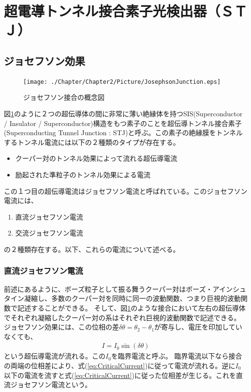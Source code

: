 	
\section{超電導トンネル接合素子光検出器（ＳＴＪ）}

	\subsection{ジョセフソン効果}
	\begin{figure}[htbp]
  		\begin{center}
    			\texttt{[image: ./Chapter/Chapter2/Picture/JosephsonJunction.eps]}
    			\caption{ジョセフソン接合の概念図}
    			\label{fig:JosephsonJunction}
  		\end{center}
	\end{figure}
	図\ref{fig:JosephsonJunction}のように２つの超伝導体の間に非常に薄い絶縁体を持つSIS(Superconductor / Insulator / Superconductor)構造をもつ素子のことを超伝導トンネル接合素子(Superconducting Tunnel Junction : STJ)と呼ぶ。この素子の絶縁膜をトンネルするトンネル電流には以下の２種類のタイプが存在する。	
	\begin{itemize}
		\item クーパー対のトンネル効果によって流れる超伝導電流
		\item 励起された準粒子のトンネル効果による電流
	\end{itemize}	
	この１つ目の超伝導電流はジョセフソン電流と呼ばれている。このジョセフソン電流には、
	\begin{enumerate}
		\item 直流ジョセフソン電流
		\item 交流ジョセフソン電流
	\end{enumerate}
	の２種類存在する。以下、これらの電流について述べる。
		\subsubsection{直流ジョセフソン電流}
		前述にあるように、ボーズ粒子として振る舞うクーパー対はボーズ・アインシュタイン凝縮し、多数のクーパー対を同時に同一の波動関数、つまり巨視的波動関数で記述することができる。
		そして、図\ref{fig:JosephsonJunction}のような接合において左右の超伝導体でそれぞれ凝縮したクーパー対の系はそれぞれ巨視的波動関数で記述できる。
		ジョセフソン効果には、この位相の差$\delta \theta = \theta_{2} - \theta_{1}$が寄与し、電圧を印加していなくても、
		\begin{eqnarray}
			I = I_{0} \sin (\delta \theta)
			\label{eq:CriticalCurrent}
		\end{eqnarray}
		という超伝導電流が流れる。この$I_{0}$を臨界電流と呼ぶ。
		臨界電流以下なら接合の両端の位相差により、式(\ref{eq:CriticalCurrent})に従って電流が流れる。逆に$I_{0}$以下の電流を流すと式(\ref{eq:CriticalCurrent})に従った位相差が生じる。これを直流ジョセフソン電流という。
